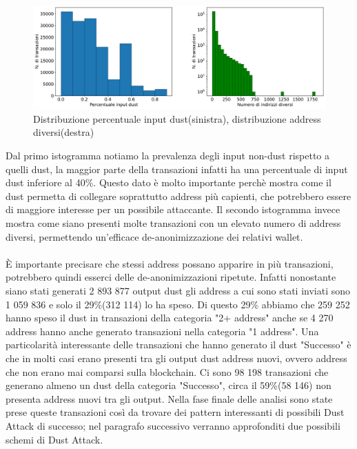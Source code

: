  \begin{figure}[h!]
     \centering
     \includegraphics[scale=0.44]{Grafici/Distribuzioni_belle.pdf}
     \caption{Distribuzione percentuale input dust(sinistra), distribuzione address diversi(destra)}
    \label{fig:distribuzioni_tx}
 \end{figure}
\FloatBarrier
Dal primo istogramma notiamo la prevalenza degli input non-dust rispetto a quelli dust, la maggior parte della transazioni infatti ha una percentuale di input dust inferiore al 40\%. Questo dato è molto importante perchè mostra come il dust permetta di collegare soprattutto address più capienti, che potrebbero essere di maggiore interesse per un possibile attaccante. Il secondo istogramma invece mostra come siano presenti molte transazioni con un elevato numero di address diversi, permettendo un'efficace de-anonimizzazione dei relativi wallet.\\\\
È importante precisare che stessi address possano apparire in più transazioni, potrebbero quindi esserci delle de-anonimizzazioni ripetute. Infatti nonostante siano stati generati 2 893 877 output dust gli address a cui sono stati inviati sono 1 059 836 e solo il 29\%(312 114) lo ha speso. Di questo 29\% abbiamo che 259 252 hanno speso il dust in transazioni della categoria "2+ address" anche se 4 270 address hanno anche generato transazioni nella categoria "1 address". Una particolarità interessante delle transazioni che hanno generato il dust "Successo" è che in molti casi erano presenti tra gli output dust address nuovi, ovvero address che non erano mai comparsi sulla blockchain. Ci sono 98 198 transazioni che generano almeno un dust della categoria "Successo", circa il 59\%(58 146) non presenta address nuovi tra gli output. Nella fase finale delle analisi sono state prese queste transazioni così da trovare dei pattern interessanti di possibili Dust Attack di successo; nel paragrafo successivo verranno approfonditi due possibili schemi di Dust Attack.  
